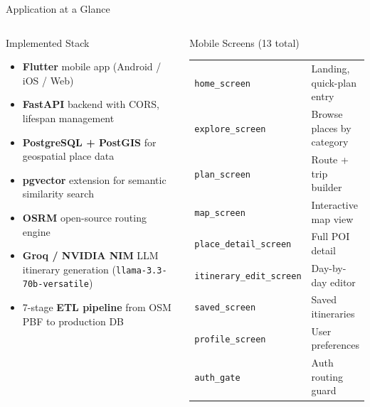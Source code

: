 \documentclass[aspectratio=169,professionalfonts]{beamer}
\newcommand{\hl}[1]{\textbf{\textcolor{ysblue}{#1}}}
\begin{document}
\begin{frame}{Application at a Glance}
  \begin{columns}[T]
    \begin{block}{Implemented Stack}
      \begin{itemize}
        \item \hl{Flutter} mobile app (Android / iOS / Web)
        \item \hl{FastAPI} backend with CORS, lifespan management
        \item \hl{PostgreSQL + PostGIS} for geospatial place data
        \item \hl{pgvector} extension for semantic similarity search
        \item \hl{OSRM} open-source routing engine
        \item \hl{Groq / NVIDIA NIM} LLM itinerary generation
              (\texttt{llama-3.3-70b-versatile})
        \item 7-stage \hl{ETL pipeline} from OSM PBF to production DB
      \end{itemize}
    \end{block}

    \begin{block}{Mobile Screens (13 total)}
      \small
      \begin{tabular}{ll}
        \texttt{home\_screen}           & Landing, quick-plan entry\\
        \texttt{explore\_screen}        & Browse places by category\\
        \texttt{plan\_screen}           & Route + trip builder\\
        \texttt{map\_screen}            & Interactive map view\\
        \texttt{place\_detail\_screen}  & Full POI detail\\
        \texttt{itinerary\_edit\_screen}& Day-by-day editor\\
        \texttt{saved\_screen}          & Saved itineraries\\
        \texttt{profile\_screen}        & User preferences\\
        \texttt{auth\_gate}             & Auth routing guard\\
      \end{tabular}
    \end{block}
  \end{columns}
\end{frame}
\end{document}
